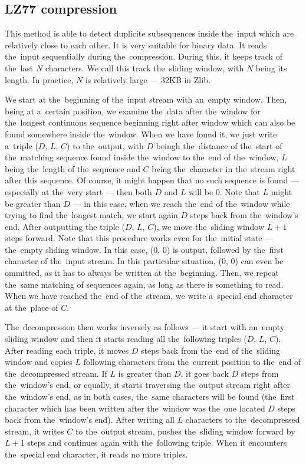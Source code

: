 \subsection*{LZ77 compression}\label{subsec:lz77}

This method is able to detect duplicite subsequences inside the~input which are relatively close to each other. It is very suitable for binary data. It reads the~input sequentially during the~compression. During this, it keeps track of the~last $N$ characters. We call this track the~sliding window, with $N$ being its length. In practice, $N$ is relatively large --- 32KB in Zlib. 

We start at the~beginning of the~input stream with an~empty window. Then, being at a~certain position, we examine the~data after the~window for the~longest continuous sequence beginning right after window which can also be found somewhere inside the~window. When we have found it, we just write a~triple ($D$, $L$, $C$) to the~output, with $D$ beingh the~distance of the~start of the~matching sequence found inside the~window to the~end of the~window, $L$ being the~length of the~sequence and $C$ being the~character in the~stream right after this sequence. Of course, it might happen that no such sequence is found --- especially at the~very start --- then both $D$ and $L$ will be 0. Note that $L$ might be greater than $D$ --- in this case, when we reach the~end of the~window while trying to find the~longest match, we start again $D$ steps back from the~window's end. After outputting the triple ($D$, $L$, $C$), we move the~sliding window $L + 1$ steps forward. Note that this procedure works even for the~initial state --- the~empty sliding window. In this case, (0, 0) is output, followed by the~first character of the~input stream. In this particular situation, (0, 0) can even be ommitted, as it has to always be written at the~beginning. Then, we repeat the~same matching of sequences again, as long as there is something to read. When we have reached the~end of the~stream, we write a~special end character at the~place of $C$.

The~decompression then works inversely as follows --- it start with an~empty sliding window and then it starts reading all the~following triples ($D$, $L$, $C$). After reading each triple, it moves $D$ steps back from the~end of the~sliding window and copies $L$ following characters from the~current position to the~end of the~decompressed stream. If $L$ is greater than $D$, it goes back $D$ steps from the~window's end, or equally, it starts traversing the~output stream right after the~window's end, as in both cases, the~same characters will be found (the~first character which has been written after the~window was the~one located $D$ steps back from the~window's end). After writing all $L$ characters to the~decompressed stream, it writes $C$ to the~output stream, pushes the~sliding window forward by $L + 1$ steps and continues again with the~following triple. When it encounters the~special end character, it reads no more triples.

